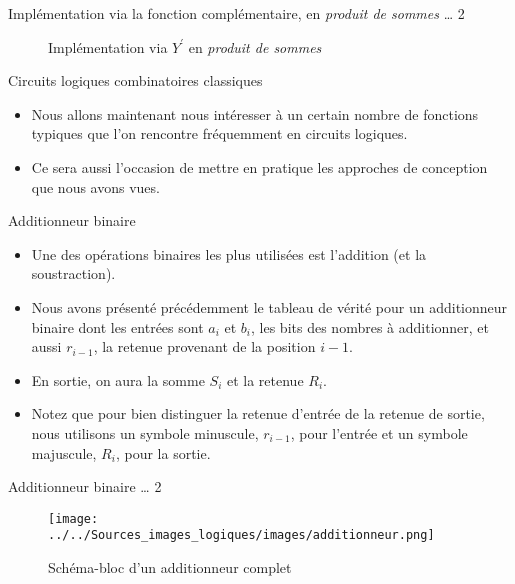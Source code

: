 \documentclass[presentation]{beamer}
\begin{document}
\begin{frame}[label={sec:org000c2d3}]{Implémentation via la fonction complémentaire, en \emph{produit de sommes} \ldots{} 2}
\begin{figure}[htbp]
\centering

\caption{\label{fig:orgee3960a}Implémentation via \(Y^\prime\) en \emph{produit de sommes}}
\end{figure} 
\end{frame}

\begin{frame}[label={sec:org9619208}]{Circuits logiques combinatoires classiques}
\begin{itemize}
\item Nous allons maintenant nous intéresser à un certain nombre de fonctions typiques que l'on rencontre fréquemment en circuits logiques.

\item Ce sera aussi l'occasion de mettre en pratique les approches de conception que nous avons vues.
\end{itemize}
\end{frame}


\begin{frame}[label={sec:org4a7c552}]{Additionneur binaire}
\begin{itemize}
\item Une des opérations binaires les plus utilisées est l'addition (et la soustraction).

\item Nous avons présenté précédemment le tableau de vérité pour un additionneur binaire dont les entrées sont \(a_{i}\) et \(b_{i}\), les bits des nombres à additionner, et aussi \(r_{i-1}\), la retenue provenant de la position \(i-1\).

\item En sortie, on aura la somme \(S_{i}\) et la retenue \(R_{i}\).

\item Notez que pour bien distinguer la retenue d'entrée de la retenue de sortie, nous utilisons un symbole minuscule, \(r_{i-1}\), pour l'entrée et un symbole majuscule, \(R_{i}\), pour la sortie.
\end{itemize}
\end{frame}

\begin{frame}[label={sec:orgd69c7ed}]{Additionneur binaire \ldots{} 2}
\begin{figure}[htbp]
\centering
\texttt{[image: ../../Sources\_images\_logiques/images/additionneur.png]}
\caption{\label{fig:orgc72f15a}Schéma-bloc d'un additionneur complet}
\end{figure}
\end{frame}
\end{document}
